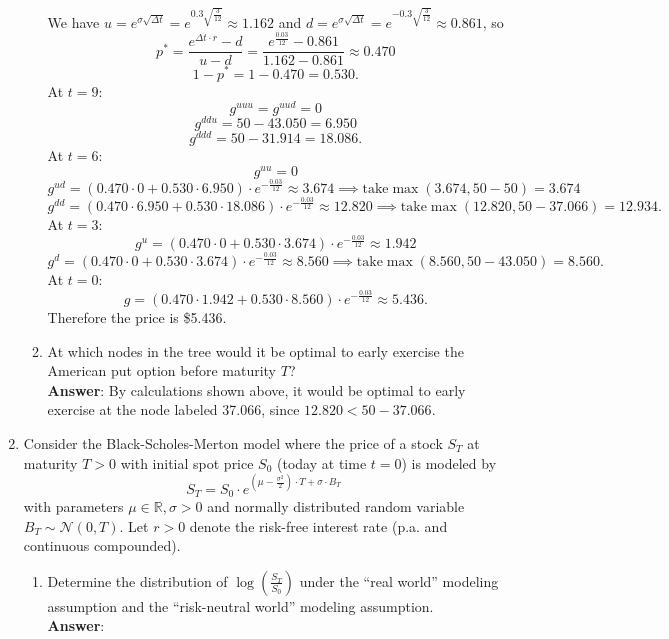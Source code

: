 \documentclass{article}
\begin{document}
\begin{enumerate}
\begin{enumerate}
\begin{center}
                        \end{center}
                        We have $u=e^{\sigma\sqrt{\Delta t}}=e^{0.3\sqrt{\frac{3}{12}}}\approx 1.162$ and $d=e^{\sigma\sqrt{\Delta t}}=e^{-0.3\sqrt{\frac{3}{12}}}\approx 0.861$, so \[p^*=\frac{e^{\Delta t\cdot r}-d}{u-d}=\frac{e^{\frac{0.03}{12}}-0.861}{1.162-0.861}\approx 0.470\]\[1-p^*=1-0.470=0.530.\]
                        At $t=9$: \[g^{uuu}=g^{uud}=0\]\[g^{ddu}=50-43.050=6.950\]\[g^{ddd}=50-31.914=18.086.\]
                        At $t=6$: \[g^{uu}=0\]\[g^{ud}=(0.470\cdot 0+0.530\cdot 6.950)\cdot e^{-\frac{0.03}{12}}\approx 3.674\implies\text{take}\max(3.674,50-50)=3.674\]\[g^{dd}=(0.470\cdot 6.950+0.530\cdot 18.086)\cdot e^{-\frac{0.03}{12}}\approx 12.820\implies\text{take}\max(12.820,50-37.066)=12.934.\]
                        At $t=3$: \[g^{u}=(0.470\cdot 0+0.530\cdot 3.674)\cdot e^{-\frac{0.03}{12}}\approx 1.942\]\[g^{d}=(0.470\cdot 0+0.530\cdot 3.674)\cdot e^{-\frac{0.03}{12}}\approx 8.560\implies\text{take}\max(8.560,50-43.050)=8.560.\]
                        At $t=0$: \[g=(0.470\cdot 1.942+0.530\cdot 8.560)\cdot e^{-\frac{0.03}{12}}\approx 5.436.\]
                        Therefore the price is \$5.436.
                  \item At which nodes in the tree would it be optimal to early exercise the American put option before maturity $T$?\\
                        \textbf{Answer}: By calculations shown above, it would be optimal to early exercise at the node labeled 37.066, since $12.820<50-37.066$.
            \end{enumerate}
            \newpage
      \item Consider the Black-Scholes-Merton model where the price of a stock $S_T$ at maturity $T>0$ with initial spot price $S_0$ (today at time $t=0$) is modeled by \[S_T=S_0\cdot e^{(\mu-\frac{\sigma^2}{2})\cdot T+\sigma\cdot B_T}\] with parameters $\mu\in\mathbb{R},\sigma>0$ and normally distributed random variable $B_T\sim\mathcal{N}(0,T)$. Let $r>0$ denote the risk-free interest rate (p.a. and continuous compounded).
            \begin{enumerate}
                  \item Determine the distribution of $\log\left(\frac{S_T}{S_0}\right)$ under the ``real world'' modeling assumption and the ``risk-neutral world'' modeling assumption.\\
                        \textbf{Answer}:
                        \begin{itemize}

\end{itemize}
\end{enumerate}
\end{enumerate}
\end{document}
